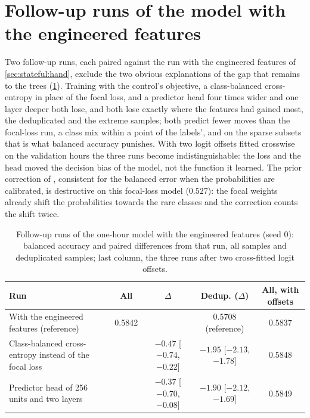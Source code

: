 \section{Follow-up runs of the model with the engineered features}
\label{app:results:followup}

Two follow-up runs, each paired against the run with the engineered features of
\cref{sec:stateful:hand}, exclude the two obvious explanations of the gap that remains to
the trees (\cref{tab:app:followup}).  Training with the control's objective, a
class-balanced cross-entropy in place of the focal loss, and a predictor head four times
wider and one layer deeper both lose, and both lose exactly where the features had gained
most, the deduplicated and the extreme samples; both predict fewer moves than the focal-loss
run, a class mix within a point of the labels', and on the sparse subsets that is what
balanced accuracy punishes.  With two logit offsets fitted crosswise on the validation
hours the three runs become indistinguishable: the loss and the head moved the decision
bias of the model, not the function it learned.  The prior correction of
\textcite{menon2021logitadjustment}, consistent for the balanced error when the
probabilities are calibrated, is destructive on this focal-loss model ($0.527$): the focal
weights already shift the probabilities towards the rare classes and the correction counts
the shift twice.

\begin{table}[t]
\centering
\caption{Follow-up runs of the one-hour model with the engineered features (seed 0):
balanced accuracy and paired differences from that run, all samples and deduplicated
samples; last column, the three runs after two cross-fitted logit offsets.}
\label{tab:app:followup}
\small
\begin{fittable}\begin{tabular}{lcccc}
\toprule
Run & All & $\Delta$ & Dedup. ($\Delta$) & All, with offsets \\
\midrule
With the engineered features (reference) & 0.5842 & & 0.5708 (reference) & 0.5837 \\
Class-balanced cross-entropy instead of the focal loss & & $-0.47$ [$-0.74$, $-0.22$] & $-1.95$ [$-2.13$, $-1.78$] & 0.5848 \\
Predictor head of 256 units and two layers & & $-0.37$ [$-0.70$, $-0.08$] & $-1.90$ [$-2.12$, $-1.69$] & 0.5849 \\
\bottomrule
\end{tabular}\end{fittable}
\end{table}

